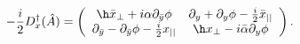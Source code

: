 \begin{equation}\label{weylop}
-\frac{i}{2} D_x^\dagger(\hat A)=
\left(
\begin{array}{cc}
\h \bar x_\perp +i\alpha\partial_{\bar y}\phi&
\partial_y+\partial_y\phi-\frac{i}{2}\bar x_{||}
\\
\partial_{\bar y}-\partial_{\bar y}\phi-\frac{i}{2}x_{||}
&\h x_\perp-i \bar\alpha\partial_y\phi
\end{array}\right). 
\end{equation}

